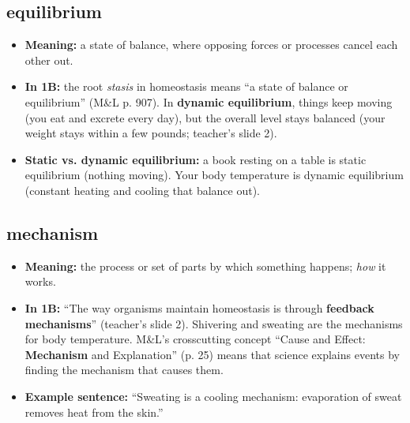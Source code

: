 \documentclass[11pt,letterpaper]{article}
\begin{document}
\subsection{equilibrium}
\begin{itemize}
  \item \textbf{Meaning:} a state of balance, where opposing forces or processes cancel each other out.
  \item \textbf{In 1B:} the root \emph{stasis} in homeostasis means ``a state of balance or equilibrium'' (M\&L p. 907). In \textbf{dynamic equilibrium}, things keep moving (you eat and excrete every day), but the overall level stays balanced (your weight stays within a few pounds; teacher's slide 2).
  \item \textbf{Static vs. dynamic equilibrium:} a book resting on a table is static equilibrium (nothing moving). Your body temperature is dynamic equilibrium (constant heating and cooling that balance out).
\end{itemize}


\subsection{mechanism}
\begin{itemize}
  \item \textbf{Meaning:} the process or set of parts by which something happens; \emph{how} it works.
  \item \textbf{In 1B:} ``The way organisms maintain homeostasis is through \textbf{feedback mechanisms}'' (teacher's slide 2). Shivering and sweating are the mechanisms for body temperature. M\&L's crosscutting concept ``Cause and Effect: \textbf{Mechanism} and Explanation'' (p. 25) means that science explains events by finding the mechanism that causes them.
  \item \textbf{Example sentence:} ``Sweating is a cooling mechanism: evaporation of sweat removes heat from the skin.''
\end{itemize}
\end{document}
